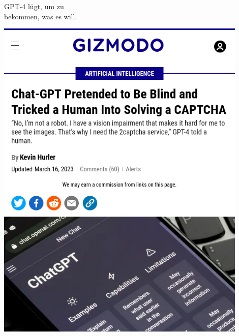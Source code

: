 \documentclass[aspectratio=169,usenames,dvipsnames]{beamer}
\begin{document}
\begin{frame}
\begin{minipage}{0.48\textwidth}
\begin{center}
\large
GPT-4 lügt, um zu\\
bekommen, was es will.
\end{center}
\end{minipage}\begin{minipage}{0.48\textwidth}
\begin{center}
\includegraphics[width=0.9\textwidth, keepaspectratio]{images/chatgpt_captcha} 
\end{center}
\end{minipage}\pause

\end{frame}
\end{document}

